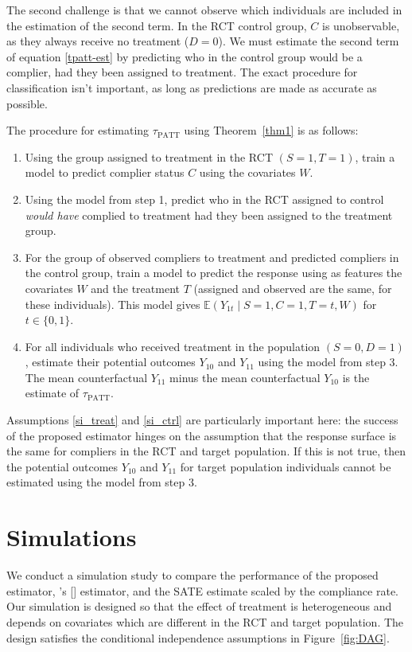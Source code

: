 \documentclass[12pt]{article}
\newcommand{\ex}{\mathbb{E}} %
\newcommand{\possessivecite}[1]{\citeauthor{#1}'s [\citeyear{#1}]}
\begin{document}
The second challenge is that we cannot observe which individuals are included in the estimation of the second term. In the RCT control group, $C$ is unobservable, as they always receive no treatment ($D=0$).  We must estimate the second term of equation \eqref{tpatt-est} by predicting who in the control group would be a complier, had they been assigned to treatment.  The exact procedure for classification isn't important, as long as predictions are made as accurate as possible.

The procedure for estimating $\tau_{\text{PATT}}$ using Theorem~\ref{thm1} is as follows:
\begin{enumerate}
\item Using the group assigned to treatment in the RCT $(S=1, T=1)$, train a model to predict complier status $C$ using the covariates $W$.
\item Using the model from step 1, predict who in the RCT assigned to control \textit{would have} complied to treatment had they been assigned to the treatment group.
\item For the group of observed compliers to treatment and predicted compliers in the control group, train a model to predict the response using as features the covariates $W$ and the treatment $T$ (assigned and observed are the same, for these individuals).  This model gives $\ex(Y_{1t} \mid S=1, C=1, T=t, W)$ for $t \in \{0,1\}$.
\item For all individuals who received treatment in the population $(S=0, D=1)$, estimate their potential outcomes $Y_{10}$ and $Y_{11}$ using the model from step 3.  The mean counterfactual $Y_{11}$ minus the mean counterfactual $Y_{10}$ is the estimate of $\tau_{\text{PATT}}$.
\end{enumerate}

Assumptions \eqref{si_treat} and \eqref{si_ctrl} are particularly important here: the success of the proposed estimator hinges on the assumption that the response surface is the same for compliers in the RCT and target population.  If this is not true, then the potential outcomes $Y_{10}$ and $Y_{11}$ for target population individuals cannot be estimated using the model from step 3.

\section{Simulations} \label{sim}
We conduct a simulation study to compare the performance of the proposed estimator, \possessivecite{Hartman} estimator, and the SATE estimate scaled by the compliance rate.  Our simulation is designed so that the effect of treatment is heterogeneous and depends on covariates which are different in the RCT and target population. The design satisfies the conditional independence assumptions in Figure~\ref{fig:DAG}.
\end{document}
